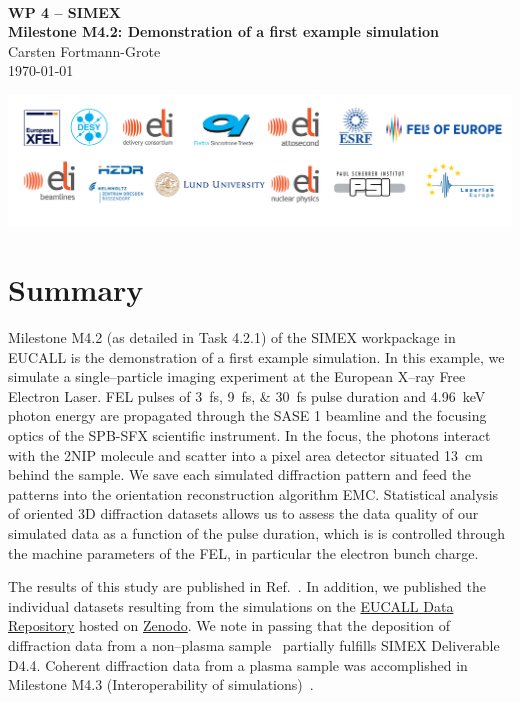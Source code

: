 \documentclass[10pt]{scrartcl}
\begin{document}
\makeatletter
\begin{titlepage}
\thispagestyle{scrheadings}
\begin{center}
  $~$\\
  \vspace{2cm}
  \Huge{\textbf{WP 4 -- SIMEX\\[1cm]
    Milestone M4.2: Demonstration of a first example simulation%
  }}\\
  \vspace{2cm}
  \large{%
    Carsten Fortmann-Grote
  }\\[1cm]
  \today
\end{center}
\vfill%
\includegraphics[width=\textwidth]{figures/PartnerLogos_2017}
\normalfont
\end{titlepage}
\makeatother
%
\tableofcontents
%
\section{Summary}
Milestone M4.2 (as detailed in Task 4.2.1) of the SIMEX workpackage in EUCALL is the demonstration of a
first example simulation. In this example, we simulate a single--particle
imaging experiment at the European X--ray Free Electron Laser. FEL pulses of
\SIlist{3;9;30}{\fs} pulse duration and \SI{4.96}{\keV} photon energy are propagated
through the SASE 1 beamline and the focusing optics of the SPB-SFX scientific
instrument. In the focus, the photons interact with the 2NIP molecule and
scatter into a pixel area detector situated \SI{13}{cm} behind the sample. We
save each simulated diffraction pattern and feed the patterns into the
orientation reconstruction algorithm EMC. Statistical analysis of oriented 3D
diffraction datasets allows us to assess the data quality of our simulated data as
a function of the pulse duration, which is is controlled through the machine
parameters of the FEL, in particular the electron bunch charge.

The results of this study are published in
Ref.~\cite{Fortmann-Grote2017}. In addition, we published the individual
datasets resulting from the simulations on the
\href{https://zenodo.org/communities/eucall-data}{EUCALL Data Repository} hosted
on \href{https://www.zenodo.org/}{Zenodo}. We note in passing that the
deposition of diffraction data from a non--plasma sample~\cite{Fortmann-Grote2017.zenodo.886087}
partially fulfills SIMEX Deliverable D4.4. Coherent diffraction data
from a plasma sample was accomplished in Milestone M4.3 (Interoperability of
simulations)~\cite{EUCALL_SIMEX_M4.3}.
\end{document}
